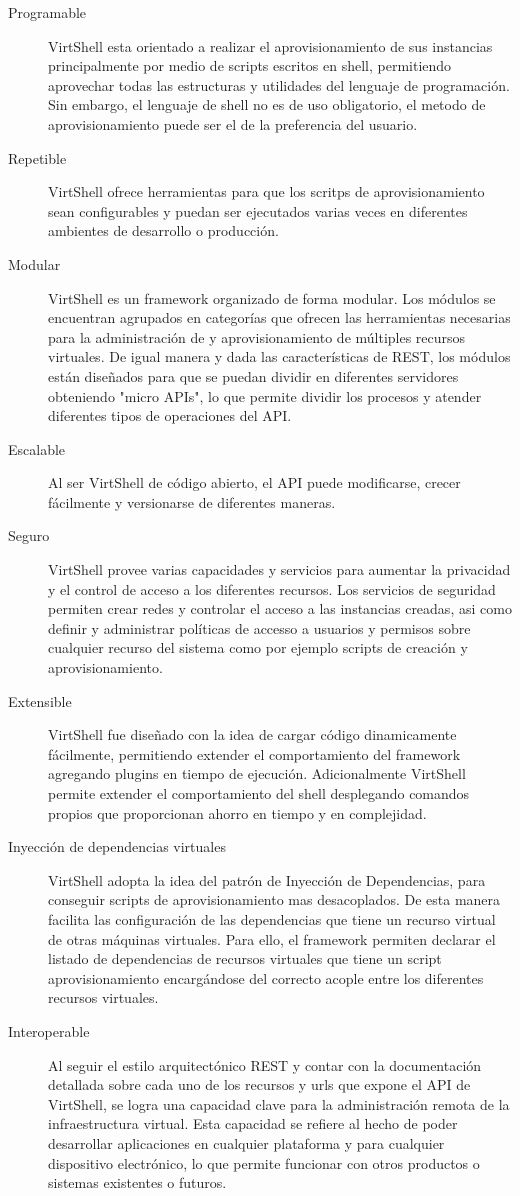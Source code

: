 \begin{description}
\item [Programable] VirtShell esta orientado a realizar el aprovisionamiento de sus instancias principalmente por medio de scripts escritos en shell, permitiendo aprovechar todas las estructuras y utilidades del lenguaje de programación. Sin embargo, el lenguaje de shell no es de uso obligatorio, el  metodo de aprovisionamiento puede ser el de la preferencia del usuario. 
\item [Repetible] VirtShell ofrece herramientas para que los scritps de aprovisionamiento sean configurables y  puedan ser ejecutados varias veces en diferentes ambientes de desarrollo o producción.
\item [Modular] VirtShell es un framework organizado de forma modular. Los módulos se encuentran agrupados en categorías que ofrecen las herramientas necesarias para la administración de y aprovisionamiento de múltiples recursos virtuales. De igual manera y dada las características de REST, los módulos están diseñados para que se puedan dividir en diferentes servidores obteniendo "micro APIs", lo que permite dividir los procesos y atender diferentes tipos de operaciones del API. 
\item [Escalable] Al ser VirtShell de código abierto, el API puede modificarse, crecer fácilmente y versionarse de diferentes maneras. 
\item [Seguro] VirtShell provee varias capacidades y servicios para aumentar la privacidad y el control de acceso a los diferentes recursos. Los servicios de seguridad permiten crear redes y controlar el acceso a las instancias creadas, asi como definir y administrar políticas de accesso a usuarios y permisos sobre cualquier recurso del sistema como por ejemplo scripts de creación y aprovisionamiento.
\item [Extensible] VirtShell fue diseñado con la idea de cargar código dinamicamente fácilmente, permitiendo extender el comportamiento del framework agregando plugins en tiempo de ejecución.  Adicionalmente VirtShell permite extender el comportamiento del shell desplegando comandos propios que proporcionan ahorro en tiempo y en complejidad.
\item [Inyección de dependencias virtuales] VirtShell adopta la idea del patrón de Inyección de Dependencias, para conseguir scripts de aprovisionamiento mas desacoplados. De esta manera facilita las configuración de las dependencias que tiene un recurso virtual de otras máquinas virtuales. Para ello, el framework permiten declarar el listado de dependencias de recursos virtuales que tiene un script aprovisionamiento encargándose del correcto acople entre los diferentes recursos virtuales.
\item [Interoperable] Al seguir el estilo arquitectónico REST y contar con la documentación detallada sobre cada uno de los recursos y urls que expone el API de VirtShell, se logra una capacidad clave para la administración remota de la infraestructura virtual. Esta capacidad se refiere al hecho de poder desarrollar aplicaciones en cualquier plataforma y para cualquier dispositivo electrónico, lo que permite funcionar con otros productos o sistemas existentes o futuros.


\end{description}
